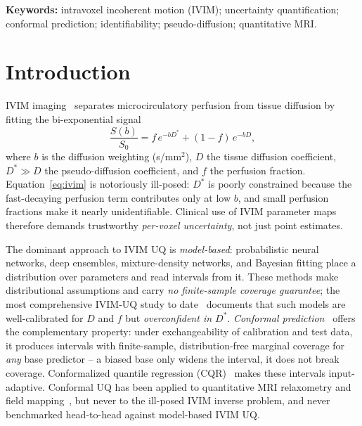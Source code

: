 \documentclass[11pt]{article}
\newcommand{\Dstar}{D^{*}}
\begin{document}
\vspace{0.5em}
\noindent\textbf{Keywords:} intravoxel incoherent motion (IVIM); uncertainty
quantification; conformal prediction; identifiability; pseudo-diffusion;
quantitative MRI.

\section{Introduction}
IVIM imaging~\citep{lebihan1988} separates microcirculatory perfusion from tissue
diffusion by fitting the bi-exponential signal
\begin{equation}
\frac{S(b)}{S_0} = f\,e^{-b\Dstar} + (1-f)\,e^{-bD},
\label{eq:ivim}
\end{equation}
where $b$ is the diffusion weighting (s/mm$^2$), $D$ the tissue diffusion
coefficient, $\Dstar \gg D$ the pseudo-diffusion coefficient, and $f$ the
perfusion fraction. Equation~\eqref{eq:ivim} is notoriously ill-posed: $\Dstar$ is
poorly constrained because the fast-decaying perfusion term contributes only at
low $b$, and small perfusion fractions make it nearly unidentifiable. Clinical use
of IVIM parameter maps therefore demands trustworthy \emph{per-voxel uncertainty},
not just point estimates.

The dominant approach to IVIM UQ is \emph{model-based}: probabilistic neural
networks, deep ensembles, mixture-density networks, and Bayesian fitting place a
distribution over parameters and read intervals from it. These methods make
distributional assumptions and carry \emph{no finite-sample coverage guarantee};
the most comprehensive IVIM-UQ study to date~\citep{casali2026} documents that
such models are well-calibrated for $D$ and $f$ but \emph{overconfident in
$\Dstar$}. \emph{Conformal prediction}~\citep{vovk2005,lei2018,angelopoulos2023}
offers the complementary property: under exchangeability of calibration and test
data, it produces intervals with finite-sample, distribution-free marginal
coverage for \emph{any} base predictor -- a biased base only widens the interval,
it does not break coverage. Conformalized quantile regression
(CQR)~\citep{romano2019} makes these intervals input-adaptive. Conformal UQ has
been applied to quantitative MRI relaxometry and field
mapping~\citep{birk2024}, but never to the ill-posed IVIM inverse problem, and
never benchmarked head-to-head against model-based IVIM UQ.
\end{document}
